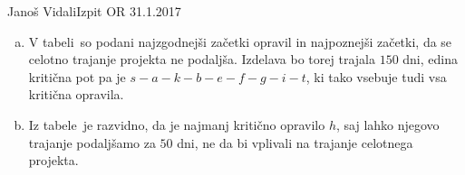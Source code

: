\begin{naloga}{Janoš Vidali}{Izpit OR 31.1.2017}
\begin{odgovor}
\begin{enumerate}[(a)]
\item V tabeli~ so podani
najzgodnejši začetki opravil in najpoznejši začetki,
da se celotno trajanje projekta ne podaljša.
Izdelava bo torej trajala $150$ dni,
edina kritična pot pa je $s - a - k - b - e - f - g - i - t$,
ki tako vsebuje tudi vsa kritična opravila.

\item Iz tabele~ je razvidno,
da je najmanj kritično opravilo $h$,
saj lahko njegovo trajanje podaljšamo za $50$ dni,
ne da bi vplivali na trajanje celotnega projekta.
\end{enumerate}
%
\begin{slika}
\makebox[\textwidth][c]{
\pgfslika
}
\end{slika}
%
\begin{tabela}
\end{tabela}
\end{odgovor}
\end{naloga}
